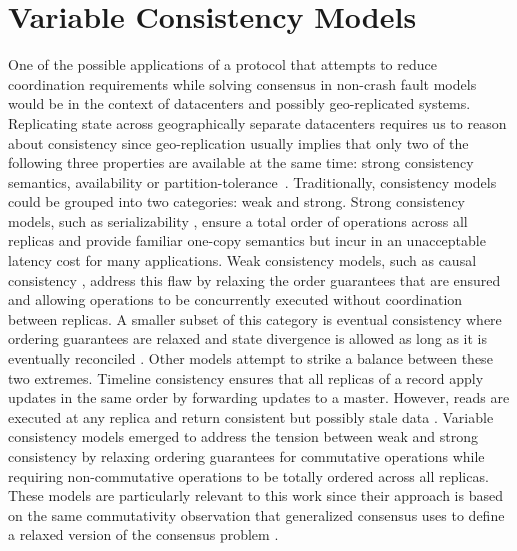 \section{Variable Consistency Models} \label{Variable Consistency}

One of the possible applications of a protocol that attempts to reduce coordination requirements while solving consensus in non-crash fault models would be in the context of datacenters and possibly geo-replicated systems. Replicating state across geographically separate datacenters requires us to reason about consistency since geo-replication usually implies that only two of the following three properties are available at the same time: strong consistency semantics, availability or partition-tolerance~\cite{Gilbert2002}. Traditionally, consistency models could be grouped into two categories: weak and strong. Strong consistency models, such as serializability \cite{Herlihy1990}, ensure a total order of operations across all replicas and provide familiar one-copy semantics but incur in an unacceptable latency cost for many applications. Weak consistency models, such as causal consistency \cite{Ahamad1995}, address this flaw by relaxing the order guarantees that are ensured and allowing operations to be concurrently executed without coordination between replicas. A smaller subset of this category is eventual consistency where ordering guarantees are relaxed and state divergence is allowed as long as it is eventually reconciled \cite{Saito2005}. Other models attempt to strike a balance between these two extremes. Timeline consistency ensures that all replicas of a record apply updates in the same order by forwarding updates to a master. However, reads are executed at any replica and return consistent but possibly stale data \cite{Silberstein2008}. Variable consistency models emerged to address the tension between weak and strong consistency by relaxing ordering guarantees for commutative operations while requiring non-commutative operations to be totally ordered across all replicas. These models are particularly relevant to this work since their approach is based on the same commutativity observation that generalized consensus uses to define a relaxed version of the consensus problem \cite{Lamport2005}.\par
